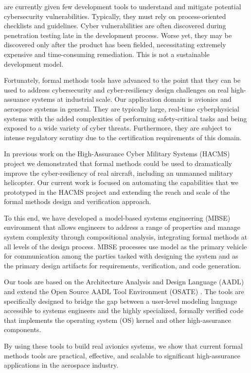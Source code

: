  are currently given few
development tools to understand and mitigate 
potential cybersecurity vulnerabilities.  Typically, they must rely on
process-oriented checklists and guidelines. Cyber vulnerabilities
are often discovered during penetration testing late in the
development process. Worse yet, they may be discovered
only after the product has been fielded, necessitating extremely
expensive and time-consuming remediation. This is not a
sustainable development model.

Fortunately, formal methods tools have advanced to the point that they can 
be used to address cybersecurity and cyber-resiliency design challenges
on real high-assuance systems at industrial scale.  
Our application domain is avionics and aerospace systems in general.  
They are typically large, real-time cyberphysicial systems with the added 
complexities of performing safety-critical tasks and being exposed to 
a wide variety of cyber threats.  Furthermore, they are subject 
to intense regulatory scrutiny due to the certification requirements of this domain. 

In previous work on the High-Assurance Cyber Military Systems (HACMS) project \cite{HACMS}
we demonstrated that formal methods could be used to dramatically improve the 
cyber-resiliency of real aircraft, including an unmanned military helicopter.  Our current
work is focused on automating the capabilities that we prototyped in the HACMS project
and extending the reach and scale of the formal methods design and verification approach.  

To this end, we have developed a model-based systems engineering (MBSE) 
environment that allows engineers to address a range of properties and 
manage system complexity through compositional analysis, integrating formal methods
at all levels of the design process.  MBSE processes use model as the primary vehicle for 
communication among the parties tasked with designing the system and as the primary 
design artifacts for requirements, verification, and code generation.  

Our tools are based on the 
Architecture Analysis and Design Language (AADL) and extend the Open Source
AADL Tool Environment (OSATE) \cite{aadl}.  The tools are specifically designed 
to bridge the gap between a user-level modeling language accessible to systems 
engineers and the highly specialized, formally verified code that implements the operating system (OS)
kernel and other high-assurance components.   

By using these tools to build real avionics systems, we show 
that current formal methods tools are practical, effective, and scalable to significant 
high-assurance applications in the aerospace industry.  

